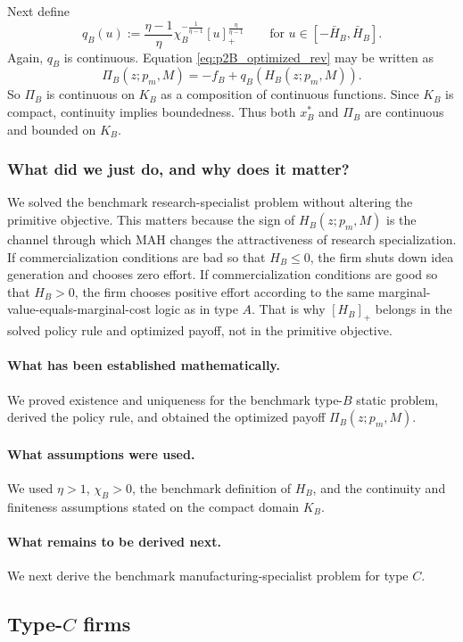 Next define
\[
q_B(u):=\frac{\eta-1}{\eta}\chi_B^{-\frac{1}{\eta-1}}[u]_+^{\frac{\eta}{\eta-1}}
\qquad\text{for }u\in[-\bar H_B,\bar H_B].
\]
Again, $q_B$ is continuous. Equation \eqref{eq:p2B_optimized_rev} may be written as
\[
\Pi_B(z;p_m,M)=-f_B+q_B(H_B(z;p_m,M)).
\]
So $\Pi_B$ is continuous on $K_B$ as a composition of continuous functions. Since $K_B$ is compact, continuity implies boundedness. Thus both $x_B^*$ and $\Pi_B$ are continuous and bounded on $K_B$.

\subsubsection*{What did we just do, and why does it matter?}
We solved the benchmark research-specialist problem without altering the primitive objective. This matters because the sign of $H_B(z;p_m,M)$ is the channel through which MAH changes the attractiveness of research specialization. If commercialization conditions are bad so that $H_B\le 0$, the firm shuts down idea generation and chooses zero effort. If commercialization conditions are good so that $H_B>0$, the firm chooses positive effort according to the same marginal-value-equals-marginal-cost logic as in type $A$. That is why $[H_B]_+$ belongs in the solved policy rule and optimized payoff, not in the primitive objective.

\paragraph{What has been established mathematically.}
We proved existence and uniqueness for the benchmark type-$B$ static problem, derived the policy rule, and obtained the optimized payoff $\Pi_B(z;p_m,M)$.

\paragraph{What assumptions were used.}
We used $\eta>1$, $\chi_B>0$, the benchmark definition of $H_B$, and the continuity and finiteness assumptions stated on the compact domain $K_B$.

\paragraph{What remains to be derived next.}
We next derive the benchmark manufacturing-specialist problem for type $C$.

\subsection{Type-$C$ firms}

